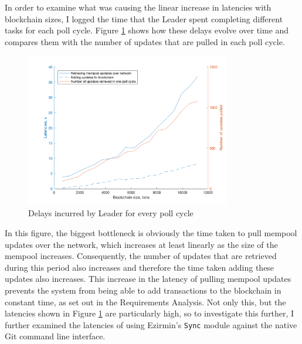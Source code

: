 \documentclass[12pt,a4paper,twoside,openright]{report}
\begin{document}
	In order to examine what was causing the linear increase in latencies with blockchain sizes, I logged the time that the Leader spent completing different tasks for each poll cycle.
	Figure \ref{figs:leaderdelays} shows how these delays evolve over time and compares them with the number of updates that are pulled in each poll cycle.
	\begin{figure}
		\centering
		\includegraphics[width=0.8\textwidth]{figs/leader_delays_num_pulled.png}
		\caption{Delays incurred by Leader for every poll cycle}
		\label{figs:leaderdelays}
	\end{figure}
	In this figure, the biggest bottleneck is obviously the time taken to pull mempool updates over the network, which increases at least linearly as the size of the mempool increases.
	Consequently, the number of updates that are retrieved during this period also increases and therefore the time taken adding these updates also increases.
	This increase in the latency of pulling mempool updates prevents the system from being able to add transactions to the blockchain in constant time, as set out in the Requirements Analysis. %
	Not only this, but the latencies shown in Figure \ref{figs:leaderdelays} are particularly high, so to investigate this further, I further examined the latencies of using Ezirmin's \texttt{Sync} module against the native Git command line interface. \\
\end{document}
